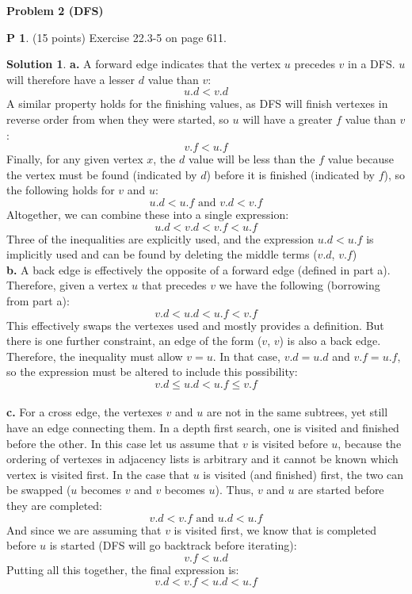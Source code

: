 \documentclass{article}
\theoremstyle{definition}
\newtheorem{problem}{P}
\newtheorem*{solution}{Solution}
\begin{document}
\noindent\textbf{Problem 2 (DFS)}
\begin{problem} (15 points)
Exercise 22.3-5 on page 611.
\end{problem}
\begin{solution}
\textbf{a.} A forward edge indicates that the vertex $u$ precedes $v$ in a DFS. $u$ will therefore have a lesser $d$ value than $v$:
$$ u.d < v.d $$
A similar property holds for the finishing values, as DFS will finish vertexes in reverse order from when they were started, so $u$ will have a greater $f$ value than $v$:
$$ v.f < u.f $$
Finally, for any given vertex $x$, the $d$ value will be less than the $f$ value because the vertex must be found (indicated by $d$) before it is finished (indicated by $f$), so the following holds for $v$ and $u$:
$$ u.d < u.f \text{ and } v.d < v.f $$
Altogether, we can combine these into a single expression:
$$ u.d < v.d < v.f < u.f $$
Three of the inequalities are explicitly used, and the expression $u.d < u.f$ is implicitly used and can be found by deleting the middle terms ($v.d$, $v.f$)\\
\textbf{b.} A back edge is effectively the opposite of a forward edge (defined in part a). Therefore, given a vertex $u$ that precedes $v$ we have the following (borrowing from part a):
$$ v.d < u.d < u.f < v.f $$
This effectively swaps the vertexes used and mostly provides a definition. But there is one further constraint, an edge of the form ($v$, $v$) is also a back edge. Therefore, the inequality must allow $v=u$. In that case, $v.d = u.d$ and $v.f = u.f$, so the expression must be altered to include this possibility:
$$ v.d \leq u.d < u.f \leq v.f $$\\
\textbf{c.} For a cross edge, the vertexes $v$ and $u$ are not in the same subtrees, yet still have an edge connecting them. In a depth first search, one is visited and finished before the other. In this case let us assume that $v$ is visited before $u$, because the ordering of vertexes in adjacency lists is arbitrary and it cannot be known which vertex is visited first. In the case that $u$ is visited (and finished) first, the two can be swapped ($u$ becomes $v$ and $v$ becomes $u$). Thus, $v$ and $u$ are started before they are completed:
$$ v.d < v.f \text{ and } u.d < u.f $$
And since we are assuming that $v$ is visited first, we know that is completed before $u$ is started (DFS will go backtrack before iterating):
$$ v.f < u.d $$
Putting all this together, the final expression is:
$$ v.d < v.f < u.d < u.f $$
\end{solution}
\end{document}
